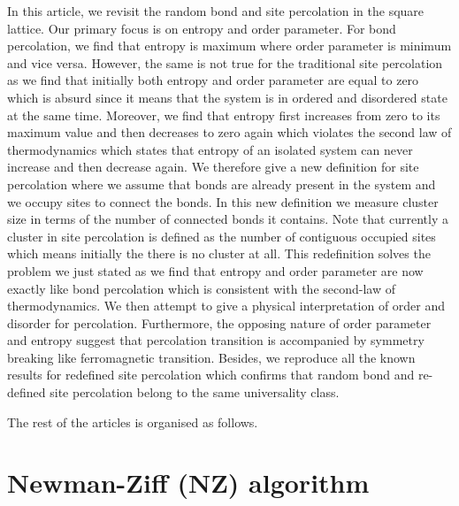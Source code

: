 \documentclass[twocolumn,showpacs,preprintnumbers,amsmath,amssymb]{article}
\begin{document}
In this article, we revisit the random bond and site percolation in the square lattice. 
Our primary focus is on entropy and order parameter. For bond percolation,
we find that entropy is maximum where order parameter is minimum and vice versa. 
However, the same is not true for the traditional site percolation as 
we find that initially both entropy and order parameter are equal to zero which 
is absurd since it means that the system is in ordered and disordered state at the same time.
Moreover, we find that entropy first increases from zero to its maximum value and
then decreases to zero again which violates the second law of thermodynamics which
states that entropy of an isolated system can never increase and then decrease again.
We therefore give a new definition for site percolation 
where we assume that bonds are already present in the system and we occupy sites to connect the bonds.
In this new definition we measure cluster size in terms of the number 
of connected bonds it contains. Note that currently a cluster in site percolation
is defined as the number of contiguous occupied sites which means initially the there is no cluster
at all. This redefinition solves the problem we just stated as we find that entropy and order parameter are now exactly like
bond percolation which is consistent with the second-law of thermodynamics.
We then attempt to give a physical interpretation of order and disorder for percolation.
Furthermore, the opposing nature of order parameter and entropy suggest that percolation
transition is accompanied by symmetry breaking like ferromagnetic transition. 
 Besides, we reproduce all the known results for redefined site percolation which confirms that 
random bond and re-defined site percolation belong to the same universality class. 

The rest of the articles is organised as follows. 


\section{Newman-Ziff (NZ) algorithm}
\end{document}
